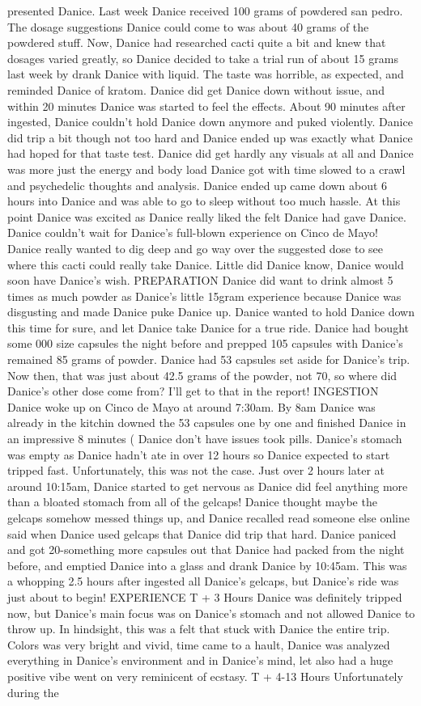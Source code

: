 \documentclass[12pt]{book}
\begin{document}
presented Danice. Last week Danice received 100 grams of powdered san pedro. The dosage suggestions Danice could come to was about 40 grams of the powdered stuff. Now, Danice had researched cacti quite a bit and knew that dosages varied greatly, so Danice decided to take a trial run of about 15 grams last week by drank Danice with liquid. The taste was horrible, as expected, and reminded Danice of kratom. Danice did get Danice down without issue, and within 20 minutes Danice was started to feel the effects. About 90 minutes after ingested, Danice couldn't hold Danice down anymore and puked violently. Danice did trip a bit though not too hard and Danice ended up was exactly what Danice had hoped for that taste test. Danice did get hardly any visuals at all and Danice was more just the energy and body load Danice got with time slowed to a crawl and psychedelic thoughts and analysis. Danice ended up came down about 6 hours into Danice and was able to go to sleep without too much hassle. At this point Danice was excited as Danice really liked the felt Danice had gave Danice. Danice couldn't wait for Danice's full-blown experience on Cinco de Mayo! Danice really wanted to dig deep and go way over the suggested dose to see where this cacti could really take Danice. Little did Danice know, Danice would soon have Danice's wish. PREPARATION Danice did want to drink almost 5 times as much powder as Danice's little 15gram experience because Danice was disgusting and made Danice puke Danice up. Danice wanted to hold Danice down this time for sure, and let Danice take Danice for a true ride. Danice had bought some 000 size capsules the night before and prepped 105 capsules with Danice's remained 85 grams of powder. Danice had 53 capsules set aside for Danice's trip. Now then, that was just about 42.5 grams of the powder, not 70, so where did Danice's other dose come from? I'll get to that in the report! INGESTION Danice woke up on Cinco de Mayo at around 7:30am. By 8am Danice was already in the kitchin downed the 53 capsules one by one and finished Danice in an impressive 8 minutes ( Danice don't have issues took pills. Danice's stomach was empty as Danice hadn't ate in over 12 hours so Danice expected to start tripped fast. Unfortunately, this was not the case. Just over 2 hours later at around 10:15am, Danice started to get nervous as Danice did feel anything more than a bloated stomach from all of the gelcaps! Danice thought maybe the gelcaps somehow messed things up, and Danice recalled read someone else online said when Danice used gelcaps that Danice did trip that hard. Danice paniced and got 20-something more capsules out that Danice had packed from the night before, and emptied Danice into a glass and drank Danice by 10:45am. This was a whopping 2.5 hours after ingested all Danice's gelcaps, but Danice's ride was just about to begin! EXPERIENCE T + 3 Hours Danice was definitely tripped now, but Danice's main focus was on Danice's stomach and not allowed Danice to throw up. In hindsight, this was a felt that stuck with Danice the entire trip. Colors was very bright and vivid, time came to a hault, Danice was analyzed everything in Danice's environment and in Danice's mind, let also had a huge positive vibe went on very reminicent of ecstasy. T + 4-13 Hours Unfortunately during the 
\end{document}
